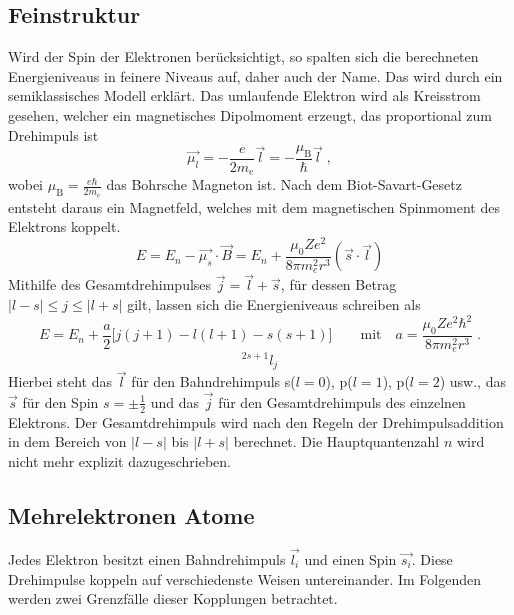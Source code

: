     \subsection{Feinstruktur}
        Wird der Spin der Elektronen berücksichtigt, so spalten sich die berechneten Energieniveaus in feinere Niveaus auf, daher auch der Name.
        Das wird durch ein semiklassisches Modell erklärt.
        Das umlaufende Elektron wird als Kreisstrom gesehen, welcher ein magnetisches Dipolmoment erzeugt, das proportional zum Drehimpuls ist
        \begin{equation}
            \label{eqn:magnMoment}
            \vec{\mu_l} = -\frac{e}{2m_e} \vec{l} = - \frac{\mu_{\text{B}}}{\hbar} \vec{l} \;,
        \end{equation}
        wobei $\mu_{\text{B}} = \frac{e \hbar}{2 m_e}$ das Bohrsche Magneton ist.
        Nach dem Biot-Savart-Gesetz entsteht daraus ein Magnetfeld, welches mit dem magnetischen Spinmoment des Elektrons koppelt.
        \begin{equation}
            E = E_n - \vec{\mu_s} \cdot \vec{B} = E_n + \frac{\mu_0 Z e^2}{8 \pi m_e^2 r^3} \left(\vec{s} \cdot \vec{l}\right)
        \end{equation}
        Mithilfe des Gesamtdrehimpulses $\vec{j} = \vec{l} + \vec{s}$, für dessen Betrag $\vert l-s \vert \leq j \leq \vert l+s \vert$ gilt, lassen sich die Energieniveaus schreiben als
        \begin{equation}
            E = E_n + \frac{a}{2} \bigl[j(j+1) - l(l+1) - s(s+1)\bigr] \qquad \text{mit} \quad a = \frac{\mu_0 Z e^2 \hbar^2}{8 \pi m_e^2 r^3} \;.
        \end{equation}
        \begin{equation}
            \label{eqn:termschema}
            ^{2s+1}l_j
        \end{equation}
        Hierbei steht das $\vec{l}$ für den Bahndrehimpuls s($l=0$), p($l=1$), p($l=2$) usw., das $\vec{s}$ für den Spin $s = \pm \frac{1}{2}$ und das $\vec{j}$ für den Gesamtdrehimpuls des einzelnen Elektrons.
        Der Gesamtdrehimpuls wird nach den Regeln der Drehimpulsaddition in dem Bereich von $|l - s|$ bis $|l + s|$ berechnet.
        Die Hauptquantenzahl $n$ wird nicht mehr explizit dazugeschrieben.

    \subsection{Mehrelektronen Atome}
        Jedes Elektron besitzt einen Bahndrehimpuls $\vec{l_i}$ und einen Spin $\vec{s_i}$. Diese Drehimpulse koppeln auf verschiedenste Weisen untereinander. Im Folgenden werden zwei Grenzfälle dieser Kopplungen betrachtet.

